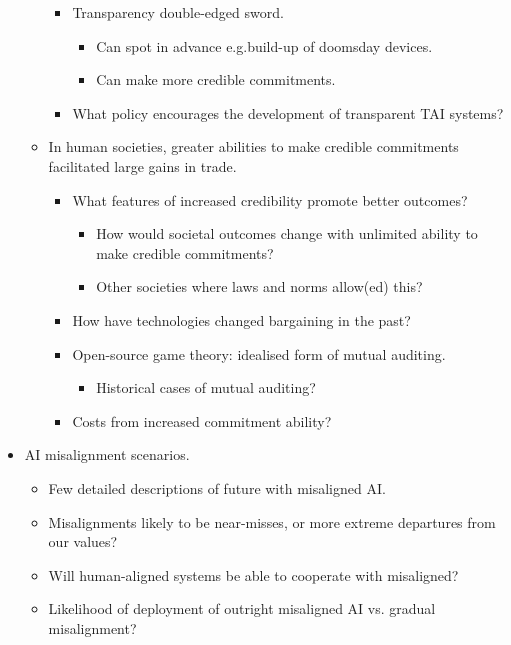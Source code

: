 \begin{itemize}
\begin{itemize}
\begin{itemize}
            \item Transparency double-edged sword.
            \begin{itemize}
                \item Can spot in advance e.g.\@ build-up of doomsday devices.
                \item Can make more credible commitments.
            \end{itemize}
            \item What policy encourages the development of transparent TAI systems?
        \end{itemize}
        \item In human societies, greater abilities to make credible commitments facilitated large gains in trade.
        \begin{itemize}
            \item What features of increased credibility promote better outcomes?
            \begin{itemize}
                \item How would societal outcomes change with unlimited ability to make credible commitments?
                \item Other societies where laws and norms allow(ed) this?
            \end{itemize}
            \item How have technologies changed bargaining in the past?
            \item Open-source game theory: idealised form of mutual auditing.
            \begin{itemize}
                \item Historical cases of mutual auditing?
            \end{itemize}
            \item Costs from increased commitment ability?
        \end{itemize}
    \end{itemize}
    \item AI misalignment scenarios.
    \begin{itemize}
        \item Few detailed descriptions of future with misaligned AI.
        \item Misalignments likely to be near-misses, or more extreme departures from our values?
        \item Will human-aligned systems be able to cooperate with misaligned?
        \item Likelihood of deployment of outright misaligned AI vs. gradual misalignment?

\end{itemize}
\end{itemize}
